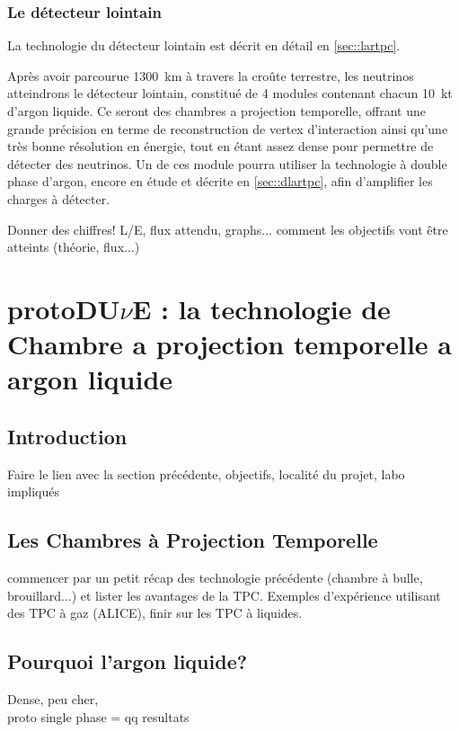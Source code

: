             \subsubsection{Le détecteur lointain}\label{sec::far_detector}
            
            La technologie du détecteur lointain est décrit en détail en \autoref{sec::lartpc}.
            
            Après avoir parcourue \SI{1300}{\kilo\meter} à travers la croûte terrestre, les neutrinos atteindrons le détecteur lointain, constitué de 4 modules contenant chacun \SI{10}{\kilo\tonne} d'argon liquide. Ce seront des chambres a projection temporelle, offrant une grande précision en terme de reconstruction de vertex d'interaction ainsi qu'une très bonne résolution en énergie, tout en étant assez dense pour permettre de détecter des neutrinos. Un de ces module pourra utiliser la technologie à double phase d'argon, encore en étude et décrite en \autoref{sec::dlartpc}, afin d'amplifier les charges à détecter.
            
            Donner des chiffres! L/E, flux attendu, graphs...
            comment les objectifs vont être atteints (théorie, flux...)
    
    \section{\texorpdfstring{protoDU$\nu$E}{protoDUNE} : la technologie de Chambre a projection temporelle a argon liquide}\label{sec::lartpc}
    
        \subsection{Introduction}
            Faire le lien avec la section précédente, objectifs, localité du projet, labo impliqués
    
        \subsection{Les Chambres à Projection Temporelle}
            commencer par un petit récap des technologie précédente (chambre à bulle, brouillard...) et lister les avantages de la TPC. Exemples d'expérience utilisant des TPC à gaz (ALICE), finir sur les TPC à liquides.
        
        \subsection{Pourquoi l'argon liquide?}
            Dense, peu cher, \\
            proto single phase = qq resultats
        
